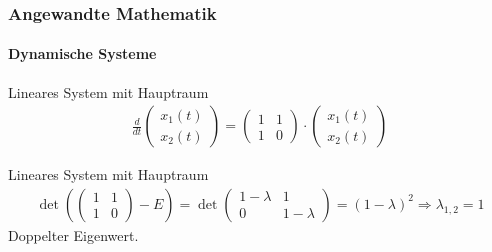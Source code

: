 \documentclass{beamer}
\begin{document}
 



 \begin{frame}
    \frametitle{Angewandte Mathematik}
\framesubtitle{Dynamische Systeme }
\begin{block}{Lineares System mit Hauptraum}
\begin{align*}
    \frac{d}{dt}\begin{pmatrix}
        x_1(t) \\ x_2(t)
    \end{pmatrix} = 
\begin{pmatrix}
    1 & 1  \\ 1 & 0
\end{pmatrix} \cdot
\begin{pmatrix} 
    x_1(t) \\ x_2(t)
\end{pmatrix} 
\end{align*}
\end{block}

\begin{block}{Lineares System mit Hauptraum}
    \begin{align*}
    \det (\begin{pmatrix}
        1 & 1  \\ 1 & 0
    \end{pmatrix} - E) = 
    \det \begin{pmatrix}
        1-\lambda & 1  \\ 0 & 1-\lambda  
    \end{pmatrix} = (1-\lambda)^2 \Rightarrow \lambda_{1,2} = 1
\end{align*}
Doppelter Eigenwert.
\end{block}

\end{frame}
\end{document}
